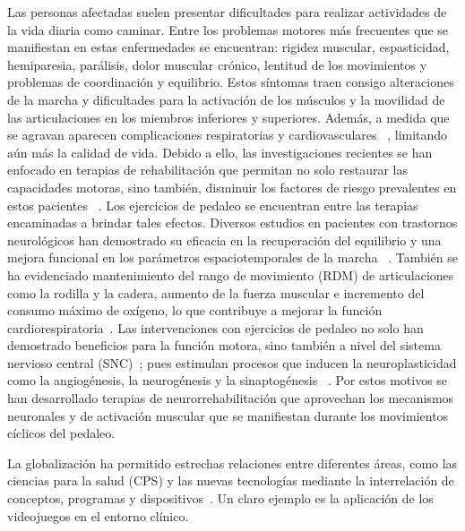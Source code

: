 \begin{introduction}
    \vspace{5pt}
    Las personas afectadas suelen presentar dificultades para realizar actividades de la vida
    diaria como caminar. Entre los problemas motores más frecuentes que se manifiestan en
    estas enfermedades se encuentran: rigidez muscular, espasticidad, hemiparesia,
    parálisis, dolor muscular crónico, lentitud de los movimientos y problemas de
    coordinación y equilibrio. Estos síntomas traen consigo alteraciones de la marcha y
    dificultades para la activación de los músculos y la movilidad de las articulaciones en los
    miembros inferiores y superiores. Además, a medida que se agravan aparecen
    complicaciones respiratorias y cardiovasculares ~\cite{barbosa2015application, miner2020therapeutic}, 
    limitando aún más la calidad de vida. Debido a ello, las investigaciones recientes se han enfocado en 
    terapias de rehabilitación que permitan no solo restaurar las capacidades motoras, sino también,
    disminuir los factores de riesgo prevalentes en estos pacientes ~\cite{barbosa2015application}. 
    Los ejercicios de pedaleo se encuentran entre las terapias encaminadas a brindar tales efectos. Diversos estudios en pacientes con trastornos neurológicos han demostrado su eficacia en la 
    recuperación del equilibrio y una mejora funcional en los parámetros espaciotemporales de la marcha
    ~\cite{quiles2020lessons, el2021effect}. También se ha evidenciado mantenimiento del rango de movimiento (RDM) de 
    articulaciones como la rodilla y la cadera, aumento de la fuerza muscular e incremento del consumo máximo 
    de oxígeno, lo que contribuye a mejorar la función cardiorespiratoria~\cite{el2021effect, ashadi2016pengaruh}. Las 
    intervenciones con ejercicios de pedaleo no solo han demostrado beneficios para la función motora, sino también a nivel del sistema nervioso
    central (SNC)~\cite{linder2019forced, alberts2011not}; pues estimulan procesos que inducen la neuroplasticidad como la angiogénesis, la neurogénesis 
    y la sinaptogénesis ~\cite{linder2019forced, el2021effect}. Por estos motivos se han desarrollado terapias de neurorrehabilitación que aprovechan 
    los mecanismos neuronales y de activación muscular que se manifiestan durante los movimientos cíclicos del pedaleo. 
    
    \vspace{5pt}
    La globalización ha permitido estrechas relaciones entre diferentes áreas, como las ciencias para la salud (CPS) y las nuevas tecnologías 
    mediante la interrelación de conceptos, programas y dispositivos~\cite{federal2008older}. Un claro ejemplo es la aplicación de los videojuegos en el 
    entorno clínico.
    

\end{introduction}
